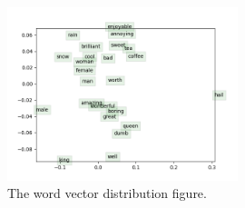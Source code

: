 \documentclass[a4 paper]{article}
\begin{document}
\begin{figure}[h]
    \begin{center}
    \includegraphics[width=0.6\textwidth]{img/word_vectors.png}
    \caption{The word vector distribution figure.}
    \label{fig:intro_example}
    \end{center}
\end{figure}
\end{document}
